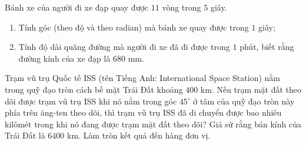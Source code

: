 \begin{bt}%

	Bánh xe của người đi xe đạp quay được $11$ vòng trong $5$ giây.
	\begin{enumerate}
	\item Tính góc (theo độ và theo radian) mà bánh xe quay được trong $1$ giây;
	\item Tính độ dài quãng đường mà người đi xe đã đi được trong $1$ phút, biết rằng đường kính của xe đạp là $680$ mm.
	\end{enumerate}
\end{bt}

\begin{bt}%

	Trạm vũ trụ Quốc tế ISS (tên Tiếng Anh: International Space Station) nằm trong quỹ đạo tròn cách bề mặt Trái Đất khoảng $400$ km. Nếu trạm mặt đất theo dõi được trạm vũ trụ ISS khi nó nằm trong góc $45^\circ$ ở tâm của quỹ đạo tròn này phía trên ăng-ten theo dõi, thì trạm vũ trụ ISS đã di chuyển được bao nhiêu kilômét trong khi nó đang được trạm mặt đất theo dõi? Giả sử rằng bán kính của Trái Đất là $6400$ km. Làm tròn kết quả đến hàng đơn vị. 
\end{bt}

